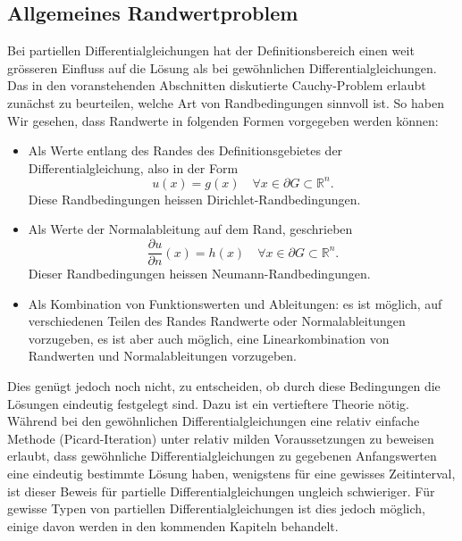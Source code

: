 \subsection{Allgemeines Randwertproblem\label{klassifikation:allgemeines-randwertproblem}}
Bei partiellen Differentialgleichungen hat der Definitionsbereich einen
weit grösseren Einfluss auf die Lösung als bei gewöhnlichen
Differentialgleichungen. Das in den voranstehenden Abschnitten
diskutierte Cauchy-Problem erlaubt zunächst zu beurteilen, welche
Art von Randbedingungen sinnvoll ist. 
So haben Wir gesehen, dass Randwerte in folgenden Formen vorgegeben
werden können: 
\begin{itemize}
\item Als Werte entlang des Randes des Definitionsgebietes der
Differentialgleichung, also in der Form
\[
u(x)=g(x)\quad \forall x\in\partial G\subset \mathbb R^n.
\]
Diese Randbedingungen heissen Dirichlet-Randbedingungen.
\item Als Werte der Normalableitung auf dem
Rand, geschrieben
\[
\frac{\partial u}{\partial n}(x)=h(x)\quad\forall x\in\partial G\subset \mathbb R^n.
\]
Dieser Randbedingungen heissen Neumann-Randbedingungen.
\item Als Kombination von Funktionswerten und Ableitungen: es ist
möglich, auf verschiedenen Teilen des Randes Randwerte oder Normalableitungen
vorzugeben, es ist aber auch möglich, eine Linearkombination
von Randwerten und Normalableitungen vorzugeben.
\end{itemize}
Dies genügt jedoch noch nicht, zu entscheiden, ob durch diese
Bedingungen die Lösungen eindeutig festgelegt sind.
Dazu ist ein vertieftere Theorie nötig. Während bei den gewöhnlichen
Differentialgleichungen eine relativ einfache Methode (Picard-Iteration)
unter relativ milden Voraussetzungen zu beweisen  erlaubt, dass
gewöhnliche Differentialgleichungen zu gegebenen Anfangswerten eine
eindeutig bestimmte Lösung haben, wenigstens für eine gewisses Zeitinterval,
ist dieser Beweis für partielle Differentialgleichungen ungleich schwieriger.
Für gewisse Typen von partiellen Differentialgleichungen ist dies jedoch
möglich, einige davon werden in den kommenden Kapiteln behandelt.

